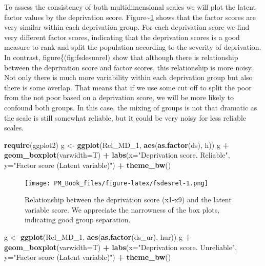 \documentclass[]{book}
\newenvironment{Shaded}{\begin{snugshade}}{\end{snugshade}}
\newcommand{\DataTypeTok}[1]{\textcolor[rgb]{0.13,0.29,0.53}{#1}}
\newcommand{\DecValTok}[1]{\textcolor[rgb]{0.00,0.00,0.81}{#1}}
\newcommand{\KeywordTok}[1]{\textcolor[rgb]{0.13,0.29,0.53}{\textbf{#1}}}
\newcommand{\NormalTok}[1]{#1}
\newcommand{\OperatorTok}[1]{\textcolor[rgb]{0.81,0.36,0.00}{\textbf{#1}}}
\newcommand{\StringTok}[1]{\textcolor[rgb]{0.31,0.60,0.02}{#1}}
\begin{document}
To assess the consistency of both multidimensional scales we will plot the latent factor values by the deprivation score. Figure\textasciitilde\ref{fig:fsdesrel} shows that the factor scores are very similar within each deprivation group. For each deprivation score we find very different factor scores, indicating that the deprivation scores is a good measure to rank and split the population according to the severity of deprivation. In contrast, figure\textasciitilde@ref\{(fig:fsdesunrel) show that although there is relationship between the deprivation score and factor scores, this relationship is more noisy. Not only there is much more variability within each deprivation group but also there is some overlap. That means that if we use some cut off to split the poor from the not poor based on a deprivation score, we will be more likely to confound both groups. In this case, the mixing of groups is not that dramatic as the scale is still somewhat reliable, but it could be very noisy for less reliable scales.

\begin{Shaded}
\begin{Highlighting}[]
\KeywordTok{require}\NormalTok{(ggplot2)}
\NormalTok{g <-}\StringTok{ }\KeywordTok{ggplot}\NormalTok{(Rel_MD_}\DecValTok{1}\NormalTok{, }\KeywordTok{aes}\NormalTok{(}\KeywordTok{as.factor}\NormalTok{(ds), h))}
\NormalTok{g }\OperatorTok{+}\StringTok{ }\KeywordTok{geom_boxplot}\NormalTok{(}\DataTypeTok{varwidth=}\NormalTok{T) }\OperatorTok{+}\StringTok{ }
\StringTok{    }\KeywordTok{labs}\NormalTok{(}\DataTypeTok{x=}\StringTok{"Deprivation score. Reliable"}\NormalTok{,}
         \DataTypeTok{y=}\StringTok{"Factor score (Latent variable)"}\NormalTok{) }\OperatorTok{+}\StringTok{ }\KeywordTok{theme_bw}\NormalTok{()}
\end{Highlighting}
\end{Shaded}

\begin{figure}
\centering
\texttt{[image: PM\_Book\_files/figure-latex/fsdesrel-1.png]}
\caption{\label{fig:fsdesrel}Relationship between the deprivation score (x1-x9) and the latent variable score. We appreciate the narrowness of the box plots, indicating good group separation.}
\end{figure}

\begin{Shaded}
\begin{Highlighting}[]
\NormalTok{g <-}\StringTok{ }\KeywordTok{ggplot}\NormalTok{(Rel_MD_}\DecValTok{1}\NormalTok{, }\KeywordTok{aes}\NormalTok{(}\KeywordTok{as.factor}\NormalTok{(ds_ur), hur))}
\NormalTok{g }\OperatorTok{+}\StringTok{ }\KeywordTok{geom_boxplot}\NormalTok{(}\DataTypeTok{varwidth=}\NormalTok{T) }\OperatorTok{+}\StringTok{ }
\StringTok{    }\KeywordTok{labs}\NormalTok{(}\DataTypeTok{x=}\StringTok{"Deprivation score. Unreliable"}\NormalTok{,}
         \DataTypeTok{y=}\StringTok{"Factor score (Latent variable)"}\NormalTok{) }\OperatorTok{+}\StringTok{ }\KeywordTok{theme_bw}\NormalTok{()}
\end{Highlighting}
\end{Shaded}
\end{document}
